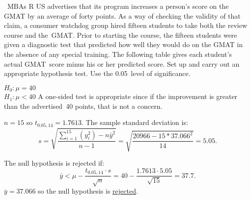 \begin{problem}
  ~MBAs R US advertises that its program increases a person's score on the GMAT by an average of forty points.  As a way of checking the validity of that claim, a consumer watchdog group hired fifteen students to take both the review course and the~GMAT\@.  Prior to starting the course, the fifteen students were given a diagnostic test that predicted how well they would do on the GMAT in the absence of any special training.  The following table gives each student's actual GMAT~score minus his or her predicted score.  Set up and carry out an appropriate hypothesis test.  Use the 0.05~level of significance.
\end{problem}

\noindent
$H_0: \mu = 40$\\
$H_1: \mu < 40$  A one-sided test is appropriate since if the improvement is greater than the advertised~40 points, that is not a concern.

${n = 15}$ so ${t_{0.05,14} = 1.7613}$.  The sample standard deviation is:
\begin{equation}
  s = \sqrt{\frac{\sum_{i=1}^{15} \left(y_{i}^2\right) - n \bar{y}^2}{n-1}} = \sqrt{\frac{20966 - 15 * 37.066^2}{14}} = 5.05\text{.}
\end{equation}

The null hypothesis is rejected if:
\begin{equation}
  \bar{y} < \mu - \frac{t_{0.05,14} \cdot s}{\sqrt{n}} = 40 - \frac{1.7613 \cdot 5.05}{\sqrt{15}} = 37.7\text{.}
\end{equation}
${\bar{y} = 37.066}$ so the null hypothesis is \underline{rejected}.
